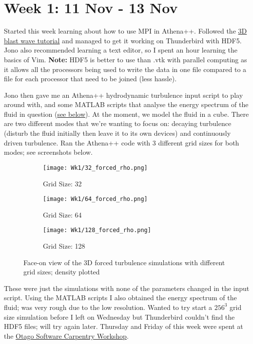 \documentclass[12pt,letterpaper]{article}
\begin{document}
\section*{Week 1: 11 Nov - 13 Nov}

Started this week learning about how to use MPI in Athena++. Followed the \href{https://github.com/PrincetonUniversity/athena-public-version/wiki/Running-3D-MHD-with-OpenMP-and-MPI}{3D blast wave tutorial} and managed to get it working on Thunderbird with HDF5. Jono also recommended learning a text editor, so I spent an hour learning the basics of Vim. \textbf{Note:} HDF5 is better to use than .vtk with parallel computing as it allows all the processors being used to write the data in one file compared to a file for each processor that need to be joined (less hassle).

Jono then gave me an Athena++ hydrodynamic turbulence input script to play around with, and some MATLAB scripts that analyse the energy spectrum of the fluid in question (\hyperlink{Kolmogorov}{see below}). At the moment, we model the fluid in a cube. There are two different modes that we're wanting to focus on: decaying turbulence (disturb the fluid initially then leave it to its own devices) and continuously driven turbulence. Ran the Athena++ code with 3 different grid sizes for both modes; see screenshots below.

\begin{figure}[!h]
 \centering
\begin{subfigure}{0.3\textwidth}
\texttt{[image: Wk1/32\_forced\_rho.png]}
\caption{Grid Size: 32}
\label{fig:32rho}
\end{subfigure}
\begin{subfigure}{0.3\textwidth}
\texttt{[image: Wk1/64\_forced\_rho.png]}
\caption{Grid Size: 64}
\label{fig:64rho}
\end{subfigure}
\begin{subfigure}{0.3\textwidth}
\texttt{[image: Wk1/128\_forced\_rho.png]}
\caption{Grid Size: 128}
\label{fig:128rho}
\end{subfigure}

\caption{Face-on view of the 3D forced turbulence simulations with different grid sizes; density plotted}
\label{fig:forcedturb}
\end{figure}

These were just the simulations with none of the parameters changed in the input script. Using the MATLAB scripts I also obtained the energy spectrum of the fluid; was very rough due to the low resolution. Wanted to try start a $256^3$ grid size simulation before I left on Wednesday but Thunderbird couldn't find the HDF5 files; will try again later. Thursday and Friday of this week were spent at the \href{https://otagocarpentries.github.io/2019-11-14-otago/}{Otago Software Carpentry Workshop}.
\end{document}
